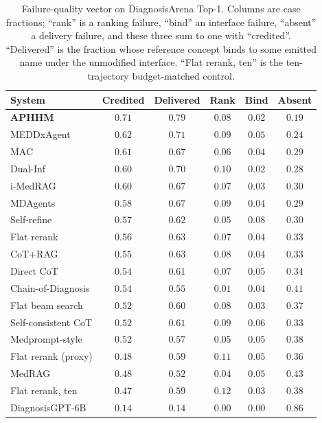 \documentclass[letterpaper]{article}
\begin{document}
\begin{table}[tb]
\centering
\footnotesize
\setlength{\tabcolsep}{2pt}
\begin{tabular}{@{}lccccc@{}}
\toprule
System & Credited & Delivered & Rank & Bind & Absent \\
\midrule
\textbf{APHHM}      & $\mathbf{0.71}$ & $0.79$ & $0.08$ & $\mathbf{0.02}$ & $\mathbf{0.19}$ \\
MEDDxAgent          & $0.62$ & $0.71$ & $0.09$ & $0.05$ & $0.24$ \\
MAC                 & $0.61$ & $0.67$ & $0.06$ & $0.04$ & $0.29$ \\
Dual-Inf            & $0.60$ & $0.70$ & $0.10$ & $0.02$ & $0.28$ \\
i-MedRAG            & $0.60$ & $0.67$ & $0.07$ & $0.03$ & $0.30$ \\
MDAgents            & $0.58$ & $0.67$ & $0.09$ & $0.04$ & $0.29$ \\
Self-refine         & $0.57$ & $0.62$ & $0.05$ & $0.08$ & $0.30$ \\
Flat rerank         & $0.56$ & $0.63$ & $0.07$ & $0.04$ & $0.33$ \\
CoT+RAG             & $0.55$ & $0.63$ & $0.08$ & $0.04$ & $0.33$ \\
Direct CoT          & $0.54$ & $0.61$ & $0.07$ & $0.05$ & $0.34$ \\
Chain-of-Diagnosis  & $0.54$ & $0.55$ & $0.01$ & $0.04$ & $0.41$ \\
Flat beam search    & $0.52$ & $0.60$ & $0.08$ & $0.03$ & $0.37$ \\
Self-consistent CoT & $0.52$ & $0.61$ & $0.09$ & $0.06$ & $0.33$ \\
Medprompt-style     & $0.52$ & $0.57$ & $0.05$ & $0.05$ & $0.38$ \\
Flat rerank (proxy) & $0.48$ & $0.59$ & $0.11$ & $0.05$ & $0.36$ \\
MedRAG              & $0.48$ & $0.52$ & $0.04$ & $0.05$ & $0.43$ \\
Flat rerank, ten    & $0.47$ & $0.59$ & $0.12$ & $0.03$ & $0.38$ \\
DiagnosisGPT-6B     & $0.14$ & $0.14$ & $0.00$ & $0.00$ & $0.86$ \\
\bottomrule
\end{tabular}
\caption{Failure-quality vector on DiagnosisArena Top-1. Columns are case fractions; ``rank'' is a ranking failure, ``bind'' an interface failure, ``absent'' a delivery failure, and these three sum to one with ``credited''. ``Delivered'' is the fraction whose reference concept binds to some emitted name under the unmodified interface. ``Flat rerank, ten'' is the ten-trajectory budget-matched control.}
\label{tab:failvec}
\end{table}
\end{document}
